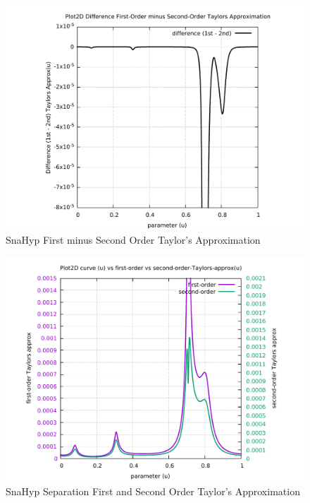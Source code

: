 \begin{figure}
	\caption     {SnaHyp First minus Second Order Taylor's Approximation}
	\label{06-img-SnaHyp-First-minus-Second-Order-Taylors-Approx.pdf}
\includegraphics[width=1.00\textwidth]{Chap4/appendix/app-SnaHyp/plots/06-img-SnaHyp-First-minus-Second-Order-Taylors-Approx.pdf}
\end{figure}

\clearpage
\pagebreak

\begin{figure}
	\caption     {SnaHyp Separation First and Second Order Taylor's Approximation}
	\label{07-img-SnaHyp-Separation-First-and-Second-Order-Taylors-Approx.pdf}
\includegraphics[width=1.00\textwidth]{Chap4/appendix/app-SnaHyp/plots/07-img-SnaHyp-First-and-Second-Order-Taylors-Approx.pdf}
\end{figure}


